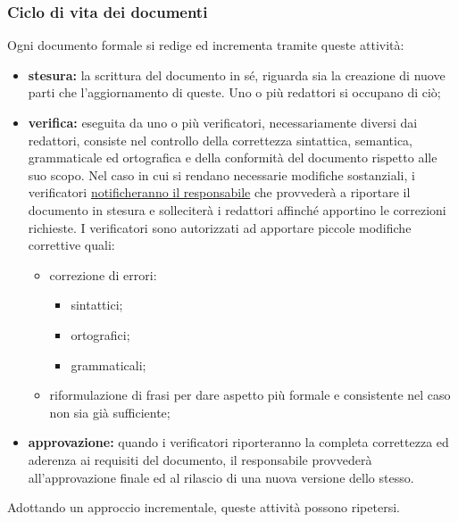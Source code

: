     \subsubsection{Ciclo di vita dei documenti}
    \label{ciclovitadoc}
    Ogni documento formale si redige ed incrementa tramite queste attività:
    \begin{itemize}
        \item \textbf{stesura: }la scrittura del documento in sé, riguarda sia la creazione di nuove parti che l'aggiornamento di queste. Uno o più redattori si occupano di ciò;
        \item \textbf{verifica: }eseguita da uno o più verificatori, necessariamente diversi dai redattori, consiste nel controllo della correttezza sintattica, semantica, grammaticale ed ortografica e della conformità del documento rispetto alle suo scopo. Nel caso in cui si rendano necessarie modifiche sostanziali, i verificatori \hyperref[risoluzioneproblemi]{notificheranno il responsabile} che provvederà a riportare il documento in stesura e solleciterà i redattori affinché apportino le correzioni richieste. I verificatori sono autorizzati ad apportare piccole modifiche correttive quali:
        \begin{itemize}
            \item correzione di errori:
                \begin{itemize}
                    \item sintattici;
                    \item ortografici;
                    \item grammaticali;
                \end{itemize}

            \item riformulazione di frasi per dare aspetto più formale e consistente nel caso non sia già sufficiente;
        \end{itemize}
        \item \textbf{approvazione: }quando i verificatori riporteranno la completa correttezza ed aderenza ai requisiti del documento, il responsabile provvederà all'approvazione finale ed al rilascio di una nuova versione dello stesso.
    \end{itemize}
    Adottando un approccio incrementale, queste attività possono ripetersi.
